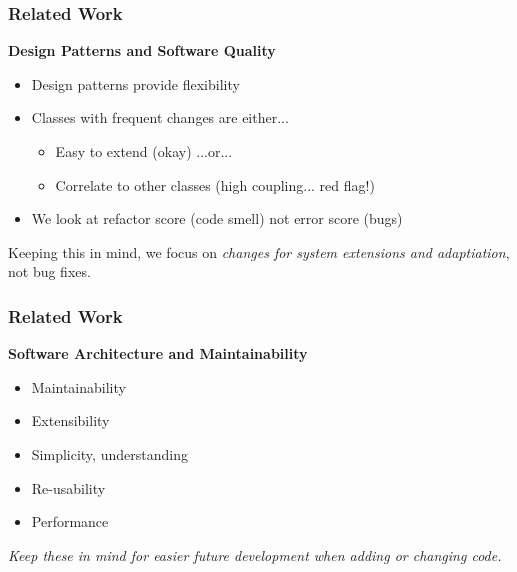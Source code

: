 \documentclass{beamer}
\begin{document}
\begin{frame}
  \frametitle{Related Work}
  \textbf{Design Patterns and Software Quality}
  \begin{itemize}
    \vspace{0.35cm}
    \item Design patterns provide flexibility
    
    \vspace{0.35cm}
    \item Classes with frequent changes are either...
    \begin{itemize}
      \vspace{0.15cm} 
      \item Easy to extend (okay)
      \vspace{0.15cm} 
      \newline ...or...
      \vspace{0.15cm}
      \item Correlate to other classes (high coupling... red flag!)
    \end{itemize}
    
    \vspace{0.35cm}
    \item We look at refactor score (code smell) not error score (bugs)
  \end{itemize}
  
  \vspace{0.35cm}
  Keeping this in mind, we focus on \emph{changes for system extensions and adaptiation}, not bug fixes.
\end{frame}

\begin{frame}
  \frametitle{Related Work}
  \textbf{Software Architecture and Maintainability}
  \begin{itemize}
    \vspace{0.35cm}
    \item Maintainability
    
    \vspace{0.35cm}
    \item Extensibility
    
    \vspace{0.35cm}
    \item Simplicity, understanding
    
    \vspace{0.35cm}
    \item Re-usability
    
    \vspace{0.35cm}
    \item Performance
  \end{itemize}

  \vspace{0.35cm}
  {\small \emph{Keep these in mind for easier future development when adding or changing code.}}
\end{frame}
\end{document}
